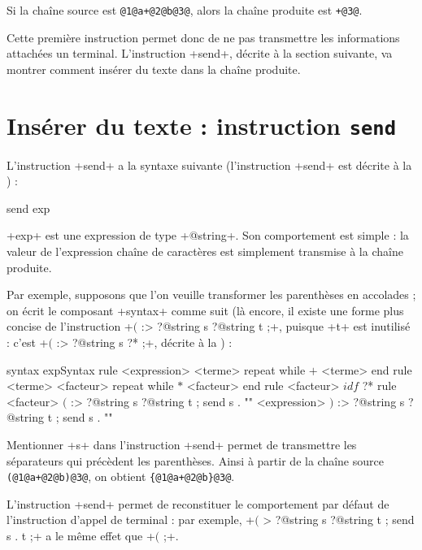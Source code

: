 Si la chaîne source est \texttt{@1@a+@2@b@3@}, alors la chaîne produite est \texttt{+@3@}.

Cette première instruction permet donc de ne pas transmettre les informations attachées un terminal. L'instruction \ggs+send+, décrite à la section suivante, va montrer comment insérer du texte dans la chaîne produite.










\section{Insérer du texte : instruction \texttt{send}}

L'instruction \ggs+send+ a la syntaxe suivante (l'instruction \ggs+send+ est décrite à la ) :

\begin{galgascode}
send exp
\end{galgascode}

\ggs+exp+ est une expression de type \ggs+@string+. Son comportement est simple : la valeur de l'expression chaîne de caractères est simplement transmise à la chaîne produite.

Par exemple, supposons que l'on veuille transformer les parenthèses en accolades ; on écrit le composant \ggs+syntax+ comme suit (là encore, il existe une forme plus concise de l'instruction \ggs+$($ :> ?@string s ?@string t ;+, puisque \ggs+t+ est inutilisé : c'est \ggs+$($ :> ?@string s ?* ;+, décrite  à la ) :
\begin{galgascode}
syntax expSyntax {
  rule <expression> {
    <terme>
    repeat while $+$ <terme> end
  }
  rule <terme> {
    <facteur>
    repeat while $*$ <facteur> end
  }
  rule <facteur> {
    $idf$ ?*
  }
  rule <facteur> {
    $($ :> ?@string s ?@string t ; send s . "{"
    <expression>
    $)$ :> ?@string s ?@string t ; send s . "}"
  }
}
\end{galgascode}

Mentionner \ggs+s+ dans l'instruction \ggs+send+ permet de transmettre les séparateurs qui précèdent les parenthèses. Ainsi à partir de la chaîne source \texttt{(@1@a+@2@b)@3@}, on obtient \texttt{\{@1@a+@2@b\}@3@}.


L'instruction \ggs+send+ permet de reconstituer le comportement par défaut de l'instruction d'appel de terminal : par exemple, \ggs+$($ \:> ?@string s ?@string t ; send s . t ;+ a le même effet que \ggs+$($ ;+.


